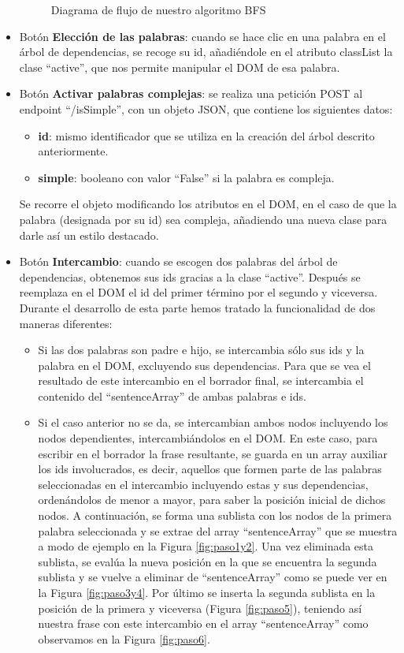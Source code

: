 \begin{itemize}
\begin{figure}[h!]
		
		\caption{Diagrama de flujo de nuestro algoritmo BFS}
		\label{fig:diagramaBFS}
	\end{figure}
	
		\item Botón \textbf{Elección de las palabras}: cuando se hace clic en una palabra en el árbol de dependencias, se recoge su id, añadiéndole en el atributo classList la clase ``active'', que nos permite manipular el DOM de esa palabra. 
	\item Botón \textbf{Activar palabras complejas}: se realiza una petición POST al endpoint ``/isSimple'', con un objeto JSON, que contiene los siguientes datos:
		\begin{itemize}
		\item \textbf{id}: mismo identificador que se utiliza en la creación del árbol descrito anteriormente.
		\item \textbf{simple}: booleano con valor ``False'' si la palabra es compleja.
	
	\end{itemize}
		
Se recorre el objeto modificando los atributos en el DOM, en el caso de que la palabra (designada por su id) sea compleja, añadiendo una nueva clase para darle así un estilo destacado.
	
	\item Botón \textbf{Intercambio}: cuando se escogen dos palabras del árbol de dependencias, obtenemos sus ids gracias a la clase ``active''. Después se reemplaza en el DOM el id del primer término por el segundo y viceversa.
	Durante el desarrollo de esta parte hemos tratado la funcionalidad de dos maneras diferentes:
	\begin{itemize}
		\item Si las dos palabras son padre e hijo, se intercambia sólo sus ids y la palabra en el DOM, excluyendo sus dependencias.
		Para que se vea el resultado de este intercambio en el borrador final, se intercambia el contenido del ``sentenceArray'' de ambas palabras e ids.  
		\item Si el caso anterior no se da, se intercambian ambos nodos incluyendo los nodos dependientes, intercambiándolos en el DOM. En este caso, para escribir en el borrador la frase resultante, se guarda en un array auxiliar los ids involucrados, es decir, aquellos que formen parte de las palabras seleccionadas en el intercambio incluyendo estas y sus dependencias, ordenándolos de menor a mayor, para saber la posición inicial de dichos nodos. A continuación, se forma una sublista con los nodos de la primera palabra seleccionada y se extrae del array ``sentenceArray'' que se muestra a modo de ejemplo en la Figura \ref{fig:paso1y2}. Una vez eliminada esta sublista, se evalúa la nueva posición en la que se encuentra la segunda sublista y se vuelve a eliminar de ``sentenceArray'' como se puede ver en la Figura \ref{fig:paso3y4}. Por último se inserta la segunda sublista en la posición de la primera y viceversa (Figura \ref{fig:paso5}), teniendo así nuestra frase con este intercambio en el array ``sentenceArray'' como observamos en la Figura \ref{fig:paso6}.
			\begin{figure}[h!]
			\centering
			

\end{figure}
\end{itemize}
\end{itemize}
